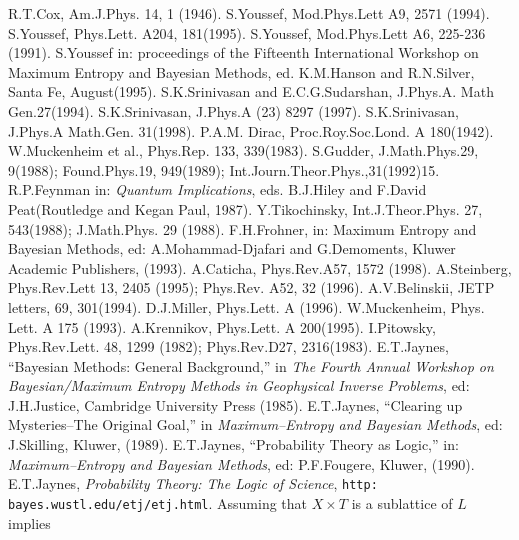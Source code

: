 \documentclass[12pt]{article}
\begin{document}
 
\begin{thebibliography}{10}
 R.T.Cox, Am.J.Phys. 14, 1 (1946).
 S.Youssef, Mod.Phys.Lett A9, 2571 (1994).
 S.Youssef, Phys.Lett. A204, 181(1995).
 S.Youssef, Mod.Phys.Lett A6, 225-236 (1991).
 S.Youssef in: proceedings of the Fifteenth International Workshop 
on Maximum Entropy and Bayesian Methods, ed. K.M.Hanson and R.N.Silver, Santa Fe, 
August(1995).
 S.K.Srinivasan and E.C.G.Sudarshan, J.Phys.A. Math Gen.27(1994).
 S.K.Srinivasan, J.Phys.A (23) 8297 (1997).
 S.K.Srinivasan, J.Phys.A Math.Gen. 31(1998).
 P.A.M. Dirac, Proc.Roy.Soc.Lond. A 180(1942).
 W.Muckenheim et al., Phys.Rep. 133, 339(1983).
 S.Gudder, J.Math.Phys.29, 9(1988); Found.Phys.19, 949(1989); 
Int.Journ.Theor.Phys.,31(1992)15.
 R.P.Feynman in: {\it Quantum Implications}, eds. B.J.Hiley and
F.David Peat(Routledge and Kegan Paul, 1987).
 Y.Tikochinsky, Int.J.Theor.Phys. 27, 543(1988); J.Math.Phys. 29 (1988).
 F.H.Frohner, in: Maximum Entropy and Bayesian Methods, ed:
A.Mohammad-Djafari and G.Demoments, Kluwer Academic Publishers, (1993).
 A.Caticha, Phys.Rev.A57, 1572 (1998).
 A.Steinberg, Phys.Rev.Lett 13, 2405 (1995); Phys.Rev. A52, 32 (1996).
 A.V.Belinskii, JETP letters, 69, 301(1994).
 D.J.Miller, Phys.Lett. A (1996).
 W.Muckenheim, Phys. Lett. A 175 (1993).
 A.Krennikov, Phys.Lett. A 200(1995).
 I.Pitowsky, Phys.Rev.Lett. 48, 1299 (1982); Phys.Rev.D27, 2316(1983).
 E.T.Jaynes, ``Bayesian Methods: General Background,'' in 
{\it The Fourth Annual Workshop on Bayesian/Maximum Entropy Methods in Geophysical
Inverse Problems}, ed: J.H.Justice, Cambridge University Press (1985).
 E.T.Jaynes, ``Clearing up Mysteries--The Original Goal,'' in
{\it Maximum--Entropy and Bayesian Methods}, ed: J.Skilling, Kluwer, (1989).
 E.T.Jaynes, ``Probability Theory as Logic,'' in: 
{\it Maximum--Entropy and Bayesian Methods}, ed: P.F.Fougere, Kluwer, (1990).
 E.T.Jaynes, {\it Probability Theory: The Logic of Science}, 
{\tt http:\\bayes.wustl.edu/etj/etj.html}.
 Assuming that $X\times T$ is a sublattice of $L$ implies 

\end{thebibliography}
\end{document}
